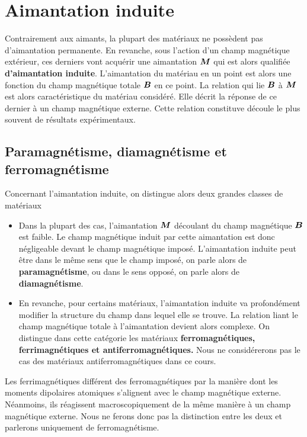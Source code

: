 \section{Aimantation induite}
Contrairement aux aimants, la plupart des 
matériaux ne possèdent pas d'aimantation permanente.
En revanche, sous l'action d'un champ magnétique extérieur, ces derniers vont acquérir 
une aimantation $\vecM$ qui est alors qualifiée \textbf{d'aimantation induite}. 
L'aimantation du matériau en un point est alors une fonction du champ magnétique 
totale $\vecb$ en ce point. La relation qui lie $\vecb$ à $\vecM$ est alors caractéristique du
matériau considéré. Elle décrit la réponse de ce dernier à un champ magnétique externe.
Cette relation constituve découle le plus souvent de résultats expérimentaux.

\subsection{Paramagnétisme, diamagnétisme et ferromagnétisme}
Concernant l'aimantation induite, on distingue alors deux grandes classes de matériaux
\begin{itemize}
	\item Dans la plupart des cas, l'aimantation $\vecM$ découlant du champ 
	  magnétique $\vecb$ est faible. Le champ magnétique induit par cette aimantation
	  est donc négligeable devant le champ magnétique imposé. L'aimantation
	  induite peut être dans le même sens que le champ imposé, on parle
	  alors de \textbf{paramagnétisme}, ou dans le sens opposé, on parle
	  alors de \textbf{diamagnétisme}.
	\item En revanche, pour certains matériaux, l'aimantation induite
	  va profondément modifier la structure du champ dans lequel elle se trouve.
	  La relation liant le champ magnétique totale à l'aimantation devient 
	  alors complexe. On distingue dans cette catégorie les matériaux 
	  \textbf{ferromagnétiques,
	  ferrimagnétiques et antiferromagnétiques.} Nous ne considérerons pas
	  le cas des matériaux antiferromagnétiques dans ce cours. 
	  \end{itemize}

Les ferrimagnétiques différent des ferromagnétiques par la manière 
dont les moments dipolaires atomiques s'alignent avec le champ magnétique
externe. Néanmoins, ils réagissent 
macroscopiquement de la même manière à un champ magnétique externe.
Nous ne ferons donc pas la distinction entre les deux et parlerons
uniquement de ferromagnétisme.

